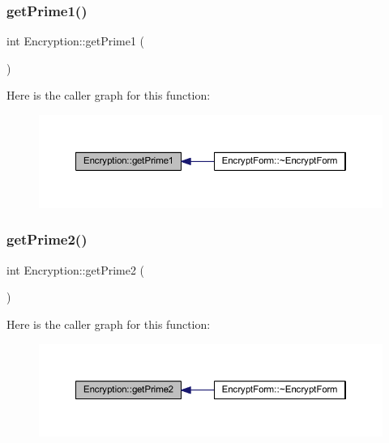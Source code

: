 \subsubsection{\texorpdfstring{get\+Prime1()}{getPrime1()}}
{\footnotesize\ttfamily int Encryption\+::get\+Prime1 (\begin{DoxyParamCaption}{ }\end{DoxyParamCaption})}

Here is the caller graph for this function\+:
\nopagebreak
\begin{figure}[H]
\begin{center}
\leavevmode
\includegraphics[width=350pt]{class_encryption_af133b980f6daf0548a7097623ed35b10_icgraph}
\end{center}
\end{figure}
\hypertarget{class_encryption_ab4089ae7185f6c10fcea6b6d697872c2}{}\label{class_encryption_ab4089ae7185f6c10fcea6b6d697872c2} 
\subsubsection{\texorpdfstring{get\+Prime2()}{getPrime2()}}
{\footnotesize\ttfamily int Encryption\+::get\+Prime2 (\begin{DoxyParamCaption}{ }\end{DoxyParamCaption})}

Here is the caller graph for this function\+:
\nopagebreak
\begin{figure}[H]
\begin{center}
\leavevmode
\includegraphics[width=350pt]{class_encryption_ab4089ae7185f6c10fcea6b6d697872c2_icgraph}
\end{center}
\end{figure}
\hypertarget{class_encryption_ab182872a04d40023eebb199abfe81896}{}\label{class_encryption_ab182872a04d40023eebb199abfe81896} 

